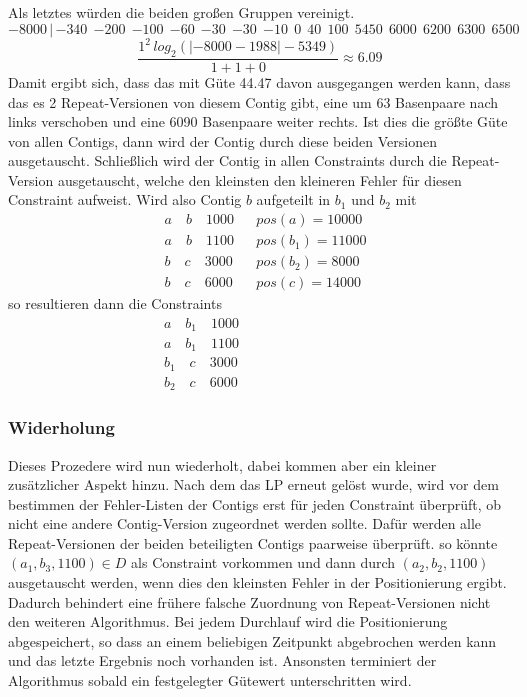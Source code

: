 \documentclass[12pt,ngerman,titlepage,a4paper]{article}
\begin{document}
Als letztes würden die beiden großen Gruppen vereinigt.
{\footnotesize \[ {-8000} \, | \, {-340} \ \ {-200} \ \ {-100} \ \ {-60} \ \ {-30} \ \ {-30} \ \ {-10} \ \ 0 \ \ 40 \ \ 100 \ \ 5450 \ \ 6000 \ \ 6200 \ \ 6300 \ \ 6500\]}
\[\frac{1^2 \, log_2( |-8000 - 1988| - 5349 )}{1 + 1 + 0 } \approx 6.09\]
Damit ergibt sich, dass das mit Güte 44.47 davon ausgegangen werden kann, dass das es 2 Repeat-Versionen von diesem Contig gibt, eine um 63 Basenpaare nach links verschoben und eine 6090 Basenpaare weiter rechts. Ist dies die größte Güte von allen Contigs, dann wird der Contig durch diese beiden Versionen ausgetauscht. Schließlich wird der Contig in allen Constraints durch die Repeat-Version ausgetauscht, welche den kleinsten den kleineren Fehler für diesen Constraint aufweist.
Wird also Contig $b$ aufgeteilt in $b_1$ und $b_2$ mit
\begin{align*}
&a \quad b \quad 1000 &&pos(a) = 10000\\
&a \quad b \quad 1100 &&pos(b_1) = 11000\\
&b \quad c \quad 3000 &&pos(b_2) = 8000\\
&b \quad c \quad 6000 &&pos(c) = 14000
\end{align*}
so resultieren dann die Constraints
\begin{align*}
&a \quad b_1 \quad 1000 &&\phantom{pos(a) = 10000}\\
&a \quad b_1 \quad 1100\\
&b_1 \quad c \quad 3000\\
&b_2 \quad c \quad 6000
\end{align*}

\subsubsection*{Widerholung} 
Dieses Prozedere wird nun wiederholt, dabei kommen aber ein kleiner zusätzlicher Aspekt hinzu.
Nach dem das LP erneut gelöst wurde, wird vor dem bestimmen der Fehler-Listen der Contigs erst für jeden Constraint überprüft,
ob nicht eine andere Contig-Version zugeordnet werden sollte.
Dafür werden alle Repeat-Versionen der beiden beteiligten Contigs paarweise überprüft.
so könnte $(a_1,b_3,1100) \in D$ als Constraint vorkommen und dann durch $(a_2,b_2,1100)$ ausgetauscht werden, wenn dies den kleinsten Fehler in der Positionierung ergibt. Dadurch behindert eine frühere falsche Zuordnung von Repeat-Versionen nicht den weiteren Algorithmus.
Bei jedem Durchlauf wird die Positionierung abgespeichert, so dass an einem beliebigen Zeitpunkt abgebrochen werden kann und das letzte Ergebnis noch vorhanden ist. Ansonsten terminiert der Algorithmus sobald ein festgelegter Gütewert unterschritten wird.
\end{document}
